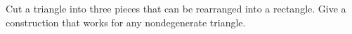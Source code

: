 Cut a triangle into three pieces that can be rearranged into a rectangle. Give a construction that works for any nondegenerate triangle.
